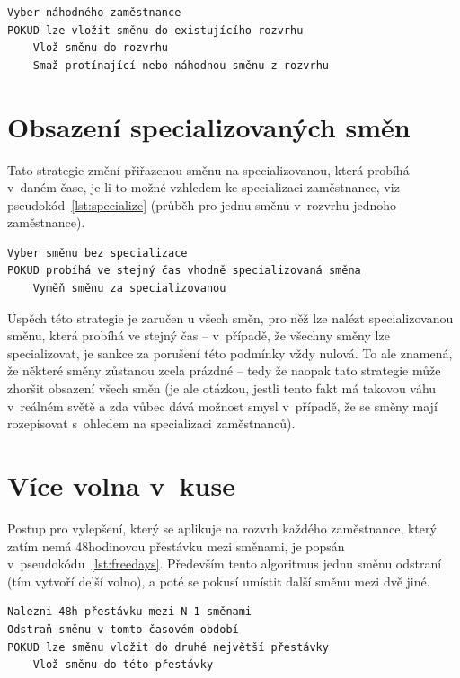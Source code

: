 \documentclass[twoside]{ctuthesis}
\begin{document}
\begin{lstlisting}[caption={Strategie pro vylepšování obsazení všech směn}, label={lst:noemptyshifts}]
Vyber náhodného zaměstnance
POKUD lze vložit směnu do existujícího rozvrhu
	Vlož směnu do rozvrhu
	Smaž protínající nebo náhodnou směnu z rozvrhu
\end{lstlisting}

\section{Obsazení specializovaných směn}
Tato strategie změní přiřazenou směnu na specializovanou, která probíhá v~daném čase, je-li to možné vzhledem ke specializaci zaměstnance, viz pseudokód~\ref{lst:specialize} (průběh pro jednu směnu v~rozvrhu jednoho zaměstnance).

\begin{lstlisting}[caption={Strategie pro obsazení specializovaných směn}, label={lst:specialize}]
Vyber směnu bez specializace
POKUD probíhá ve stejný čas vhodně specializovaná směna
	Vyměň směnu za specializovanou
\end{lstlisting}

Úspěch této strategie je zaručen u všech směn, pro něž lze nalézt specializovanou směnu, která probíhá ve stejný čas – v~případě, že všechny směny lze specializovat, je sankce za porušení této podmínky vždy nulová. To ale znamená, že některé směny zůstanou zcela prázdné – tedy že naopak tato strategie může zhoršit obsazení všech směn  (je ale otázkou, jestli tento fakt má takovou váhu v~reálném světě a zda vůbec dává možnost  smysl v~případě, že se směny mají rozepisovat s~ohledem na specializaci zaměstnanců).

\section{Více volna v~kuse}\label{sec:freedays}
Postup pro vylepšení, který se aplikuje na rozvrh každého zaměstnance, který zatím nemá 48hodinovou přestávku mezi směnami, je popsán v~pseudokódu~\ref{lst:freedays}. Především tento algoritmus jednu směnu odstraní (tím vytvoří delší volno), a poté se pokusí umístit další směnu mezi dvě jiné.

\begin{lstlisting}[caption={Strategie pro více volna v~kuse}, label={lst:freedays}]
Nalezni 48h přestávku mezi N-1 směnami
Odstraň směnu v tomto časovém období
POKUD lze směnu vložit do druhé největší přestávky
	Vlož směnu do této přestávky
\end{lstlisting}
\end{document}
